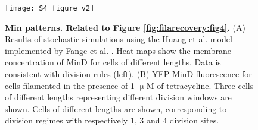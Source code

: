 \newpage

\begin{figure}
	\centering
	\texttt{[image: S4\_figure\_v2]}
	\caption{
        \label{fig:filarecovery:figsupp4}
		\textbf{%
            Min patterns. Related to Figure \ref{fig:filarecovery:fig4}.} 
		(A) Results of stochastic simulations using the Huang et al. model implemented by Fange et al. \cite{Huang2003, Fange2006}. Heat maps show the membrane concentration of MinD for cells of different lengths. Data is consistent with division rules (left). (B) YFP-MinD fluorescence for cells filamented in the presence of 1 $\upmu$M of tetracycline. Three cells of different lengths representing different division windows are shown. Cells of different lengths are shown, corresponding to division regimes with respectively 1, 3 and 4 division sites. 
	}	
\end{figure}	






%
%	
%	
%	
%	

%
%

%